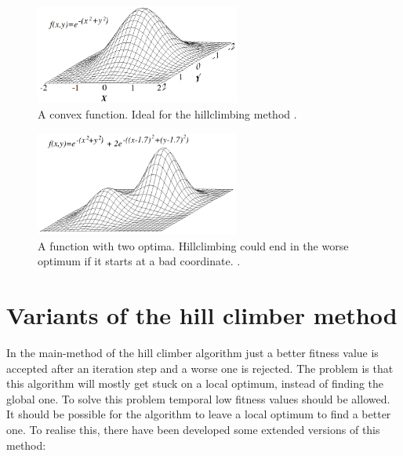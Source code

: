 \documentclass[10pt,a4paper,DIV=11]{scrreprt}
\begin{document}
\begin{center}
	\begin{figure}[H]
		\centering
		\includegraphics[width=0.6\textwidth,scale=1]{files/Hill_climb.png}  
		\caption{A convex function. Ideal for the hillclimbing method \cite{wiki-hill}.}
		\label{fig:hill}
	\end{figure}
\end{center}

\begin{center}
	\begin{figure}[H]
		\centering
		\includegraphics[width=0.6\textwidth,scale=1]{files/Local_maximum.png}  
		\caption{A function with two optima. Hillclimbing could end in the worse optimum if it starts at a bad coordinate. \cite{wiki-hill}.}
		\label{fig:hill2}
	\end{figure}
\end{center}


\section{Variants of the hill climber method}
In the main-method of the hill climber algorithm just a better fitness value is accepted after an iteration step and a worse one is rejected.
The problem is that this algorithm will mostly get stuck on a local optimum, instead of finding the global one.
To solve this problem temporal low fitness values should be allowed. It should be possible for the algorithm to leave a local optimum to find a better one.
To realise this, there have been developed some extended versions of this method: \\

 \\
\end{document}
